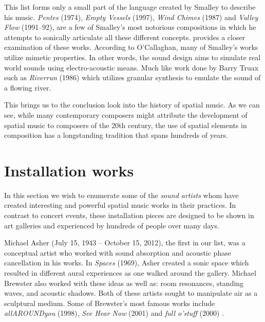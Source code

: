 This list forms only a small part of the language created by Smalley to describe his music. \textit{Pentes} (1974), \textit{Empty Vessels} (1997), \textit{Wind Chimes} (1987) and \textit{Valley Flow} (1991–92), are a few of Smalley's most notorious compositions in which he attempts to sonically articulate all these different concepts. \cite{o2011soundscape} provides a closer examination of these works. According to O'Callaghan, many of Smalley's works utilize mimetic properties. In other words, the sound design aims to simulate real world sounds using electro-acoustic means. Much like work done by Barry Truax such as \textit{Riverrun} (1986) which utilizes granular synthesis to emulate the sound of a flowing river.

This brings us to the conclusion look into the history of spatial music. As we can see, while many contemporary composers might attribute the development of spatial music to composers of the 20th century, the use of spatial elements in composition has a longstanding tradition that spans hundreds of years. 


\section{Installation works}

In this section we wish to enumerate some of the \textit{sound artists} whom have created interesting and powerful spatial music works in their practices. In contrast to concert events, these installation pieces are designed to be shown in art galleries and experienced by hundreds of people over many days. 

Michael Asher (July 15, 1943 – October 15, 2012), the first in our list, was a conceptual artist who worked with sound absorption and acoustic phase cancellation in his works. In \textit{Spaces} (1969), Asher created a sonic space which resulted in different aural experiences as one walked around the gallery. Michael Brewster also worked with these ideas as well as: room resonances, standing waves, and acoustic shadows. Both of these artists sought to manipulate air as a sculptural medium. Some of Brewster's most famous works include \textit{allAROUNDyou} (1998), \textit{See Hear Now} (2001) and \textit{full o’stuff} (2000) \cite{macedo2015investigating}. 

